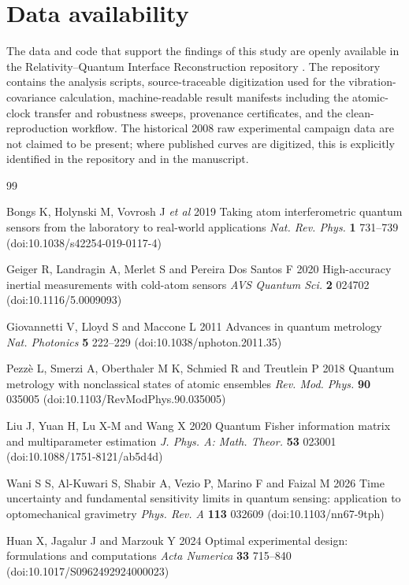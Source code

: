 \section*{Data availability}
The data and code that support the findings of this study are openly available in the Relativity--Quantum Interface Reconstruction repository \cite{RQIRRepo}. The repository contains the analysis scripts, source-traceable digitization used for the vibration-covariance calculation, machine-readable result manifests including the atomic-clock transfer and robustness sweeps, provenance certificates, and the clean-reproduction workflow. The historical 2008 raw experimental campaign data are not claimed to be present; where published curves are digitized, this is explicitly identified in the repository and in the manuscript.

\begin{thebibliography}{99}

Bongs K, Holynski M, Vovrosh J \emph{et al} 2019 Taking atom interferometric quantum sensors from the laboratory to real-world applications \emph{Nat. Rev. Phys.} \textbf{1} 731--739 (doi:10.1038/s42254-019-0117-4)

Geiger R, Landragin A, Merlet S and Pereira Dos Santos F 2020 High-accuracy inertial measurements with cold-atom sensors \emph{AVS Quantum Sci.} \textbf{2} 024702 (doi:10.1116/5.0009093)

Giovannetti V, Lloyd S and Maccone L 2011 Advances in quantum metrology \emph{Nat. Photonics} \textbf{5} 222--229 (doi:10.1038/nphoton.2011.35)

Pezz\`e L, Smerzi A, Oberthaler M K, Schmied R and Treutlein P 2018 Quantum metrology with nonclassical states of atomic ensembles \emph{Rev. Mod. Phys.} \textbf{90} 035005 (doi:10.1103/RevModPhys.90.035005)

Liu J, Yuan H, Lu X-M and Wang X 2020 Quantum Fisher information matrix and multiparameter estimation \emph{J. Phys. A: Math. Theor.} \textbf{53} 023001 (doi:10.1088/1751-8121/ab5d4d)

Wani S S, Al-Kuwari S, Shabir A, Vezio P, Marino F and Faizal M 2026 Time uncertainty and fundamental sensitivity limits in quantum sensing: application to optomechanical gravimetry \emph{Phys. Rev. A} \textbf{113} 032609 (doi:10.1103/nn67-9tph)

Huan X, Jagalur J and Marzouk Y 2024 Optimal experimental design: formulations and computations \emph{Acta Numerica} \textbf{33} 715--840 (doi:10.1017/S0962492924000023)


\end{thebibliography}
